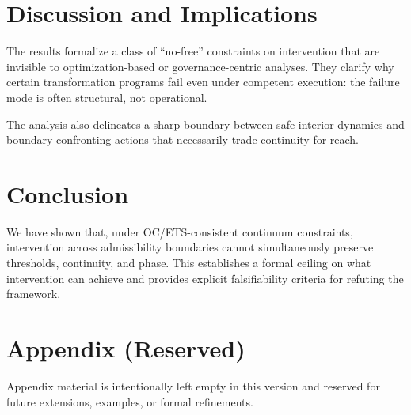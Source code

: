 ﻿\documentclass[11pt]{article}
\begin{document}
\section{Discussion and Implications}
The results formalize a class of ``no-free'' constraints on intervention that
are invisible to optimization-based or governance-centric analyses.
They clarify why certain transformation programs fail even under competent
execution: the failure mode is often structural, not operational.

The analysis also delineates a sharp boundary between safe interior dynamics
and boundary-confronting actions that necessarily trade continuity for reach.

\section{Conclusion}
We have shown that, under OC/ETS-consistent continuum constraints, intervention
across admissibility boundaries cannot simultaneously preserve thresholds,
continuity, and phase.
This establishes a formal ceiling on what intervention can achieve and provides
explicit falsifiability criteria for refuting the framework.




\appendix
\section*{Appendix (Reserved)}
Appendix material is intentionally left empty in this version and reserved
for future extensions, examples, or formal refinements.
\end{document}
